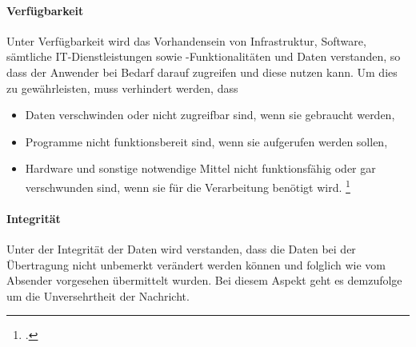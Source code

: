 \documentclass  [paper=a4,
				fontsize=12pt,
				listof=totoc,
				bibliography=totoc
				]{scrreprt}
\begin{document}
%	
%	
	\paragraph{Verfügbarkeit}
	
	Unter Verfügbarkeit wird das Vorhandensein von Infrastruktur, Software, sämtliche IT-Dienstleistungen sowie -Funktionalitäten und Daten verstanden, so dass der Anwender bei Bedarf darauf zugreifen und diese nutzen kann. Um dies zu gewährleisten, muss verhindert werden, dass
	\begin{itemize}
	\item Daten verschwinden oder nicht zugreifbar sind, wenn sie gebraucht werden,
	\item Programme nicht funktionsbereit sind, wenn sie aufgerufen werden sollen,
	\item Hardware und sonstige notwendige Mittel nicht funktionsfähig oder gar verschwunden sind, wenn sie für die Verarbeitung benötigt wird. \footcite[Vgl.][]{Berliner2014}
	\end{itemize}
	
	\paragraph{Integrität}
	
	Unter der Integrität der Daten wird verstanden, dass die Daten bei der Übertragung nicht unbemerkt verändert werden können und folglich wie vom Absender vorgesehen übermittelt wurden. Bei diesem Aspekt geht es demzufolge um die Unversehrtheit der Nachricht.
	
\end{document}
